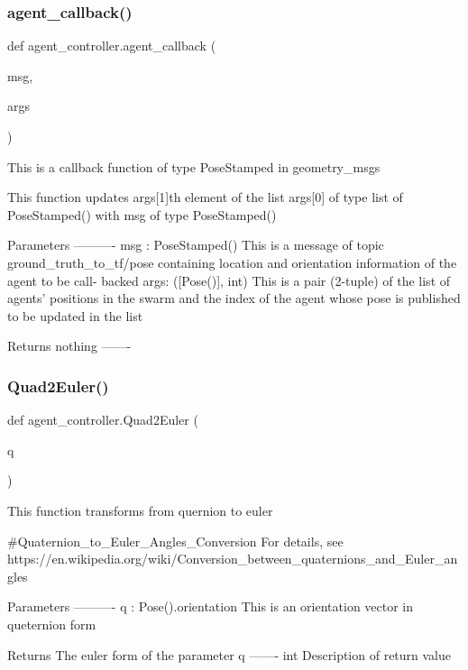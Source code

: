 \subsubsection{\texorpdfstring{agent\+\_\+callback()}{agent\_callback()}}
{\footnotesize\ttfamily def agent\+\_\+controller.\+agent\+\_\+callback (\begin{DoxyParamCaption}\item[{}]{msg,  }\item[{}]{args }\end{DoxyParamCaption})}

\begin{DoxyVerb}This is a callback function of type PoseStamped in geometry_msgs

This function updates args[1]th element of the list args[0] of type
list of PoseStamped() with msg of type PoseStamped()

Parameters
----------
msg : PoseStamped()
        This is a message of topic ground_truth_to_tf/pose containing
        location and orientation information of the agent to be call-
        backed
args: ([Pose()], int)
        This is a pair (2-tuple) of the list of agents' positions in
        the swarm and the index of the agent whose pose is published
        to be updated in the list

Returns
    nothing
-------
\end{DoxyVerb}
 \mbox{\label{namespaceagent__controller_a2a75c52da3a09e2b598dd55a4d4436ec}} 
\subsubsection{\texorpdfstring{Quad2\+Euler()}{Quad2Euler()}}
{\footnotesize\ttfamily def agent\+\_\+controller.\+Quad2\+Euler (\begin{DoxyParamCaption}\item[{}]{q }\end{DoxyParamCaption})}

\begin{DoxyVerb}This function transforms from quernion to euler

#Quaternion_to_Euler_Angles_Conversion
For details, see https://en.wikipedia.org/wiki/Conversion_between_quaternions_and_Euler_angles

Parameters
----------
q : Pose().orientation
    This is an orientation vector in queternion form

Returns
    The euler form of the parameter q
-------
int
    Description of return value
\end{DoxyVerb}
 \mbox{\label{namespaceagent__controller_a5543c9bb238164e273f7500b92d09d20}} 

